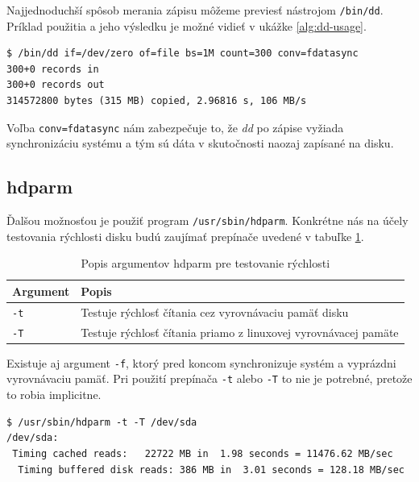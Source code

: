 Najjednoduchší spôsob merania zápisu môžeme previesť
nástrojom \texttt{/bin/dd}. Príklad použitia a jeho výsledku je možné vidieť v
ukážke \ref{alg:dd-usage}.
\\
\renewcommand{\lstlistingname}{Ukážka}
\begin{lstlisting}[label=alg:dd-usage,caption=Príklad použitia a výsledok nástroja dd]
$ /bin/dd if=/dev/zero of=file bs=1M count=300 conv=fdatasync
300+0 records in
300+0 records out
314572800 bytes (315 MB) copied, 2.96816 s, 106 MB/s
\end{lstlisting}
\renewcommand{\lstlistingname}{\listingAlgoritmus}

Voľba \texttt{conv=fdatasync} nám zabezpečuje to, že \emph{dd} po zápise
vyžiada synchronizáciu systému a tým sú dáta v skutočnosti naozaj zapísané na
disku.

%
%

\subsection{hdparm}

Ďalšou možnosťou je použiť program \texttt{/usr/sbin/hdparm}. Konkrétne nás na účely testovania rýchlosti disku budú zaujímať prepínače uvedené v tabuľke \ref{tab:hdparm-args}.

\begin{table}[H]
\begin{center}
\begin{tabular}{|l|l|}
    \hline
    \textbf{Argument} & \textbf{Popis} \\
    \hline
    \texttt{-t}  & Testuje rýchlosť čítania cez vyrovnávaciu pamäť disku \\
    \texttt{-T}  & Testuje rýchlosť čítania priamo z linuxovej vyrovnávacej pamäte \\
    \hline
\end{tabular}
\caption{Popis argumentov hdparm pre testovanie rýchlosti}
\label{tab:hdparm-args}
\end{center}
\end{table}

Existuje aj argument \texttt{-f}, ktorý pred koncom synchronizuje systém a
vyprázdni vyrovnávaciu pamäť. Pri použití prepínača \texttt{-t} alebo
\texttt{-T} to nie je potrebné, pretože to robia implicitne.

\renewcommand{\lstlistingname}{Ukážka}
\begin{lstlisting}[label=alg:hdparm-usage,caption=Príklad použitia nástroja hdparm]
$ /usr/sbin/hdparm -t -T /dev/sda
/dev/sda:
 Timing cached reads:   22722 MB in  1.98 seconds = 11476.62 MB/sec
  Timing buffered disk reads: 386 MB in  3.01 seconds = 128.18 MB/sec

\end{lstlisting}
\renewcommand{\lstlistingname}{\listingAlgoritmus}

